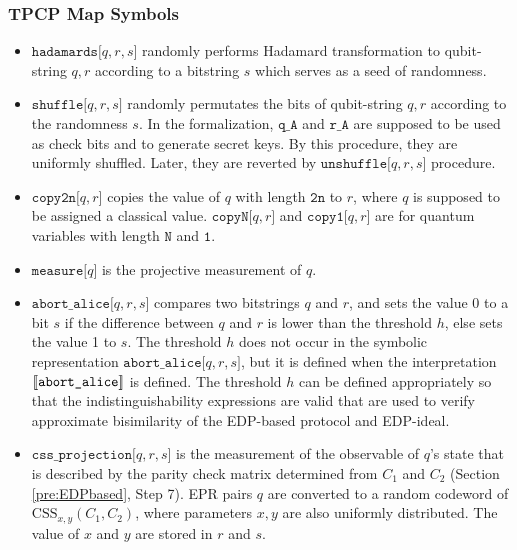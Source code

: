 \subsubsection*{TPCP Map Symbols}
\begin{itemize}
 \item $\texttt{hadamards[}q,r,s\texttt{]}$ randomly performs Hadamard
transformation
to qubit-string $q,r$ according to a bitstring $s$ which serves
as a seed of randomness.
 \item $\texttt{shuffle[}q,r,s\texttt{]}$ randomly permutates the bits
       of qubit-string $q,r$ according to the randomness $s$.
       In the formalization, $\mathtt{q\_A}$ and $\mathtt{r\_A}$ are
       supposed to be used as check bits and to generate secret keys. 
       By this procedure, they are uniformly shuffled. Later, they are
       reverted by $\texttt{unshuffle[}q,r,s\texttt{]}$ procedure.
 \item $\texttt{copy2n[}q,r\texttt{]}$ copies the value of $q$
       with length $\texttt{2n}$ to $r$, where $q$ is supposed to be
       assigned a classical value.
       $\texttt{copyN[}q,r\texttt{]}$ and $\texttt{copy1[}q,r\texttt{]}$
       are for quantum variables with length $\texttt{N}$ and
       $\texttt{1}$.
 \item $\texttt{measure[}q\texttt{]}$ is the projective measurement of
       $q$.
 \item $\texttt{abort\_alice[}q,r,s\texttt{]}$ compares two bitstrings 
       $q$ and $r$, and sets the value 0 to a bit $s$ if the difference between
       $q$ and $r$ is lower than the
       threshold $h$, else sets the value 1 to $s$.
       The threshold $h$ does not occur in the symbolic representation
       $\texttt{abort\_alice[}q,r,s\texttt{]}$, but it is defined
       when the interpretation $[\![\texttt{abort\_alice}]\!]$ is
       defined. The threshold $h$ can be defined appropriately so that
       the indistinguishability expressions are valid that are
       used to verify approximate bisimilarity of the EDP-based
       protocol and EDP-ideal.
 \item $\texttt{css\_projection[}q,r,s\texttt{]}$
       is the measurement of the observable of $q$'s state
       that is described by the parity check matrix determined from
       $C_1$ and $C_2$
       (Section \ref{pre:EDPbased}, Step 7).
       EPR pairs $q$ are converted to a random 
       codeword of $\mathrm{CSS}_{x,y}(C_1,C_2)$, where
       parameters $x,y$ are also uniformly distributed.
       The value of $x$ and $y$ are stored in $r$ and $s$.

\end{itemize}
